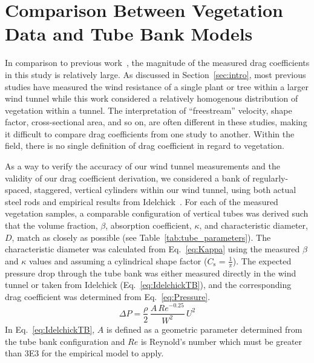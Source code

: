 \documentclass[12pt]{article}
\begin{document}
\section{Comparison Between Vegetation Data and Tube Bank Models}
\label{sec:comp}

In comparison to previous work~\cite{Cao2012,Jalonen2014,Mayhead1973,Gillies2002,Ishikawa2006}, the magnitude of the measured drag coefficients in this study is relatively large. As discussed in Section~\ref{sec:intro}, most previous studies have measured the wind resistance of a single plant or tree within a larger wind tunnel while this work considered a relatively homogenous distribution of vegetation within a tunnel. The interpretation of ``freestream'' velocity, shape factor, cross-sectional area, and so on, are often different in these studies, making it difficult to compare drag coefficients from one study to another. Within the field, there is no single definition of drag coefficient in regard to vegetation.

As a way to verify the accuracy of our wind tunnel measurements and the validity of our drag coefficient derivation, we considered a bank of regularly-spaced, staggered, vertical cylinders within our wind tunnel, using both actual steel rods and empirical results from Idelchick~\cite{Idelchick1994}. For each of the measured vegetation samples, a comparable configuration of vertical tubes was derived such that the volume fraction, $\beta$, absorption coefficient, $\kappa$, and characteristic diameter, $D$, match as closely as possible (see Table~\ref{tab:tube_parameters}). The characteristic diameter was calculated from Eq.~\ref{eq:Kappa} using the measured $\beta$ and $\kappa$ values and assuming a cylindrical shape factor ($C_{\mathrm{s}}$ = $\frac{1}{\pi}$). The expected pressure drop through the tube bank was either measured directly in the wind tunnel or taken from Idelchick (Eq.~\ref{eq:IdelchickTB}), and the corresponding drag coefficient was determined from Eq.~\ref{eq:Pressure}.
\begin{equation}
\label{eq:IdelchickTB}
\Delta P = \frac{\rho}{2}\,\frac{A\, Re^{-0.25}}{W^{2}}\, U^2
\end{equation}
In Eq.~\ref{eq:IdelchickTB}, $A$ is defined as a geometric parameter determined from the tube bank configuration and $Re$ is Reynold's number which must be greater than 3E3 for the empirical model to apply.  
\end{document}
